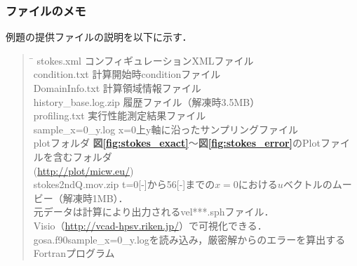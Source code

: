 \subsubsection{ファイルのメモ}
例題の提供ファイルの説明を以下に示す．
\begin{quote}
\begin{tabbing}
\hspace{15em}\= \hspace{20em}\kill
stokes.xml\> コンフィギュレーションXMLファイル\\
condition.txt \> 計算開始時conditionファイル\\
DomainInfo.txt \> 計算領域情報ファイル\\
history\_base.log.zip \> 履歴ファイル（解凍時3.5MB）\\
profiling.txt \> 実行性能測定結果ファイル\\
sample\_x=0\_y.log \> x=0上y軸に沿ったサンプリングファイル\\
plotフォルダ\> \textbf{図\ref{fig:stokes_exact}}〜\textbf{図\ref{fig:stokes_error}}のPlotファイルを含むフォルダ\\
\>(\url{http://plot/micw.eu/})\\
stokes2ndQ.mov.zip\> t=0[-]から56[-]までの$x=0$における$u$ベクトルのムービー（解凍時1MB）．\\
\>元データは計算により出力されるvel***.sphファイル．\\
\>Visio（\url{http://vcad-hpsv.riken.jp/}）で可視化できる．\\
gosa.f90\>sample\_x=0\_y.logを読み込み，厳密解からのエラーを算出するFortranプログラム
\end{tabbing}
\end{quote}

